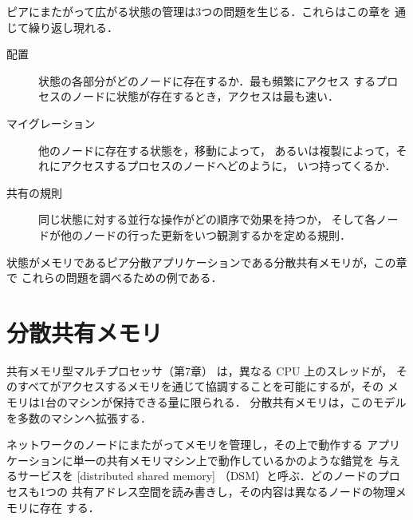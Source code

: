 \documentclass[../main.tex]{subfiles}
\begin{document}
ピアにまたがって広がる状態の管理は3つの問題を生じる．これらはこの章を
通じて繰り返し現れる．
\begin{description}
  \item[配置] 状態の各部分がどのノードに存在するか．最も頻繁にアクセス
    するプロセスのノードに状態が存在するとき，アクセスは最も速い．
  \item[マイグレーション] 他のノードに存在する状態を，移動によって，
    あるいは複製によって，それにアクセスするプロセスのノードへどのように，
    いつ持ってくるか．
  \item[共有の規則] 同じ状態に対する並行な操作がどの順序で効果を持つか，
    そして各ノードが他のノードの行った更新をいつ観測するかを定める規則．
\end{description}
状態がメモリであるピア分散アプリケーションである分散共有メモリが，この章で
これらの問題を調べるための例である．

\section{分散共有メモリ}
\label{sec:l15-dsm}

共有メモリ型マルチプロセッサ（第7章）%
%
は，異なる CPU 上のスレッドが，
そのすべてがアクセスするメモリを通じて協調することを可能にするが，その
メモリは1台のマシンが保持できる量に限られる．
分散共有メモリは，このモデルを多数のマシンへ拡張する．

\begin{definition}[分散共有メモリ]
  ネットワークのノードにまたがってメモリを管理し，その上で動作する
  アプリケーションに単一の共有メモリマシン上で動作しているかのような錯覚を
  与えるサービスを
  [distributed shared memory]%
  （DSM）と呼ぶ．どのノードのプロセスも1つの
  共有アドレス空間を読み書きし，その内容は異なるノードの物理メモリに存在
  する．
\end{definition}
\end{document}
